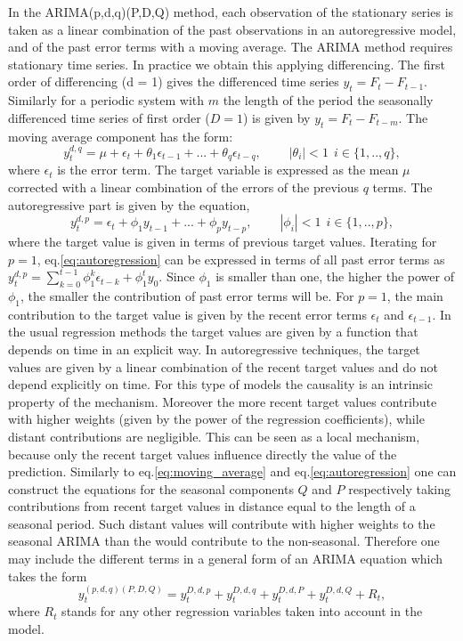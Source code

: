 \documentclass[12pt, letterpaper]{article}\usepackage[]{graphicx}\usepackage[]{color}
\begin{document}
In the ARIMA(p,d,q)(P,D,Q) method, each observation of the stationary series is taken as a linear combination of the past observations in an autoregressive model, and of the past error terms with a moving average. The ARIMA method requires stationary time series. In practice we obtain this applying differencing. The first order of differencing (d = 1) gives the differenced time series $y_t = F_t - F_{t-1}$. Similarly for a periodic system with $m$ the length of the period the seasonally differenced time series of first order ($D = 1$) is given by $y_t = F_t - F_{t-m}$. The moving average component has the form: 
\begin{equation}
y^{d,q}_t = \mu + \epsilon_t + \theta_1 \epsilon_{t-1} + ... + \theta_q \epsilon_{t-q}, ~~~~~~~~~~|\theta_i|<1 ~~ i\in\{1, ..,q\},
\label{eq:moving_average}
\end{equation}
where $\epsilon_t$ is the error term. The target variable is expressed as the mean $\mu$ corrected with a linear combination of the errors of the previous $q$ terms. The autoregressive part is given by the equation, 
\begin{equation}
y^{d,p}_t = \epsilon_t + \phi_1 y_{t-1} + ... + \phi_p y_{t-p}, ~~~~~~~~~~|\phi_i|<1 ~~ i\in\{1, ..,p\},
\label{eq:autoregression}
\end{equation}
where the target value is given in terms of previous target values. Iterating for $p = 1$, eq.\ref{eq:autoregression} can be expressed in terms of all past error terms as $y^{d,p}_t = \sum_{k= 0}^{t-1}\phi_1^k\epsilon_{t-k}+\phi_1^t y_0$. Since $\phi_1$ is smaller than one, the higher the power of $\phi_1$, the smaller the contribution of past error terms will be. For $p=1$, the main contribution to the target value is given by the recent error terms $\epsilon_t$ and  $\epsilon_{t-1}$. In the usual regression methods the target values are given by a function that depends on time in an explicit way. In autoregressive techniques, the target values are given by a linear combination of the recent target values and do not depend explicitly on time. For this type of models the causality is an intrinsic property of the mechanism. Moreover the more recent target values contribute with higher weights (given by the power of the regression coefficients), while distant contributions are negligible. This can be seen as a local mechanism, because only the recent target values influence directly the value of the prediction. Similarly to eq.\ref{eq:moving_average} and eq.\ref{eq:autoregression} one can construct the equations for the seasonal components $Q$ and $P$ respectively taking contributions from recent target values in distance equal to the length of a seasonal period. Such distant values will contribute with higher weights to the seasonal ARIMA than the would contribute to the non-seasonal. Therefore one may include the different terms in a general form of an ARIMA equation which takes the form
\begin{equation}
y^{(p,d,q)(P,D,Q)}_t = y^{D,d,p}_t +  y^{D,d,q}_t +  y^{D,d,P}_t +  y^{D,d,Q}_t + R_t,
\end{equation}
where $R_t$ stands for any other regression variables taken into account in the model. 
\end{document}

